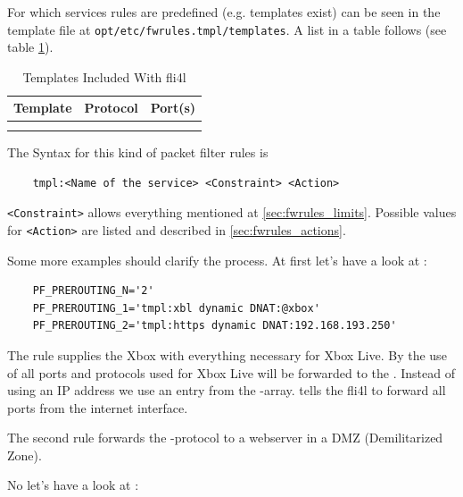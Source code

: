For which services rules are predefined (e.g. templates exist) can be seen
in the template file at \verb+opt/etc/fwrules.tmpl/templates+. A list in a table
follows (see table \ref{tab:fwrules_tmpl}).

\begin{center}
  {\footnotesize
  \begin{longtable}{|lll|}
     \hline
     {\textbf{Template}} & {\textbf{Protocol}} & {\textbf{Port(s)}} \\
     \hline\hline
     \endhead
      \\
     \hline
     \caption{Templates Included With fli4l}
     \label{tab:fwrules_tmpl}
  \end{longtable}}
\end{center}

The Syntax for this kind of packet filter rules is

\begin{example}
\begin{verbatim}
    tmpl:<Name of the service> <Constraint> <Action>
\end{verbatim}
\end{example}

\verb+<Constraint>+ allows everything mentioned at \ref{sec:fwrules_limits}.
Possible values for \verb+<Action>+ are listed and described 
in \ref{sec:fwrules_actions}.

Some more examples should clarify the process. At first let's have a look at :

\begin{example}
\begin{verbatim}
    PF_PREROUTING_N='2'
    PF_PREROUTING_1='tmpl:xbl dynamic DNAT:@xbox'
    PF_PREROUTING_2='tmpl:https dynamic DNAT:192.168.193.250'
\end{verbatim}
\end{example}

The rule  supplies the Xbox with everything necessary
for Xbox Live. By the use of  all ports and protocols used
for Xbox Live will be forwarded to the . Instead of using an IP
address we use an entry from the -array. 
tells the fli4l to forward all ports from the internet interface.

The second rule forwards the -protocol to a webserver in a DMZ
(Demilitarized Zone).

No let's have a look at :

